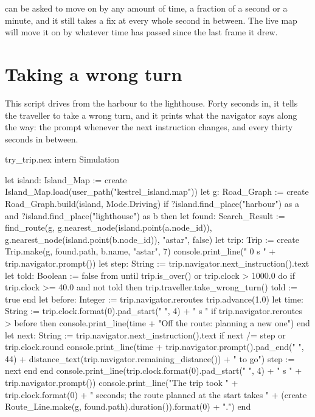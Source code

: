  can be asked to move on by any amount of time, a fraction of
a second or a minute, and it still takes a fix at every whole second in
between. The live map will move it on by whatever time has passed since
the last frame it drew.

\section{Taking a wrong turn}

This script drives from the harbour to the lighthouse. Forty seconds in,
it tells the traveller to take a wrong turn, and it prints what the
navigator says along the way: the prompt whenever the next instruction
changes, and every thirty seconds in between.

\begin{tryit}{try_trip.nex}
intern Simulation

let island: Island_Map := create Island_Map.load(user_path("kestrel_island.map"))
let g: Road_Graph := create Road_Graph.build(island, Mode.Driving)
if ?island.find_place("harbour") as a and ?island.find_place("lighthouse") as b then
  let found: Search_Result := find_route(g, g.nearest_node(island.point(a.node_id)),
    g.nearest_node(island.point(b.node_id)), "astar", false)
  let trip: Trip := create Trip.make(g, found.path, b.name, "astar", 7)
  console.print_line("   0 s  " + trip.navigator.prompt())
  let step: String := trip.navigator.next_instruction().text
  let told: Boolean := false
  from
  until
    trip.is_over() or trip.clock > 1000.0
  do
    if trip.clock >= 40.0 and not told then
      trip.traveller.take_wrong_turn()
      told := true
    end
    let before: Integer := trip.navigator.reroutes
    trip.advance(1.0)
    let time: String := trip.clock.format(0).pad_start(" ", 4) + " s  "
    if trip.navigator.reroutes > before then
      console.print_line(time + "Off the route: planning a new one")
    end
    let next: String := trip.navigator.next_instruction().text
    if next /= step or trip.clock.round %
      console.print_line(time + trip.navigator.prompt().pad_end(" ", 44)
        + distance_text(trip.navigator.remaining_distance()) + " to go")
      step := next
    end
  end
  console.print_line(trip.clock.format(0).pad_start(" ", 4) + " s  " + trip.navigator.prompt())
  console.print_line("The trip took " + trip.clock.format(0) + " seconds; the route planned at the start takes "
    + (create Route_Line.make(g, found.path).duration()).format(0) + ".")
end
\end{tryit}

